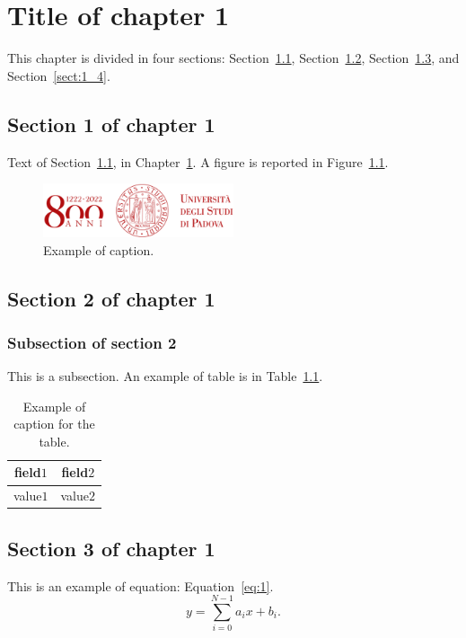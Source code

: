 
\chapter{Title of chapter 1}\label{chapt:1}
This chapter is divided in four sections: Section~\ref{sect:1_1}, Section~\ref{sect:1_2}, Section~\ref{sect:1_3}, and Section~\ref{sect:1_4}.

\section{Section 1 of chapter 1}\label{sect:1_1}  

Text of Section~\ref{sect:1_1}, in Chapter~\ref{chapt:1}. 
A figure is reported in Figure~\ref{fig:1}.

\begin{figure}[h!]
\centering
\includegraphics[width=0.5\textwidth]{figures/example.png}
\caption[Example of caption.]{Example of caption.\label{fig:1}}
\end{figure}

\section{Section 2 of chapter 1}\label{sect:1_2} 
\subsection{Subsection of section 2}\label{subsect:1_2_1} 
This is a subsection.
An example of table is in Table~\ref{tab:1}. 
\begin{table}
\centering
\begin{tabular}{c|c}
\toprule
field$1$ & field$2$ \\ \midrule
value$1$ & value$2$ \\
\bottomrule
\end{tabular}
\caption[Example of caption for the table.]{Example of caption for the table.}
\label{tab:1}
\end{table}

\section{Section 3 of chapter 1}\label{sect:1_3} 
This is an example of equation: Equation~\ref{eq:1}.
\begin{equation}
\label{eq:1}
    y = \sum_{i=0}^{N-1}a_ix + b_i.
\end{equation}

